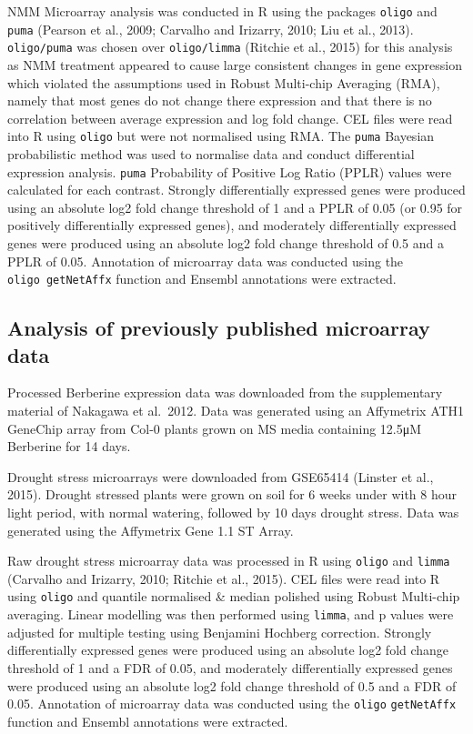 \documentclass[12pt,a4paper,]{report}
\begin{document}
NMM Microarray analysis was conducted in R using the packages
\texttt{oligo} and \texttt{puma} (Pearson et al., 2009; Carvalho and
Irizarry, 2010; Liu et al., 2013). \texttt{oligo/puma} was chosen over
\texttt{oligo/limma} (Ritchie et al., 2015) for this analysis as NMM
treatment appeared to cause large consistent changes in gene expression
which violated the assumptions used in Robust Multi-chip Averaging
(RMA), namely that most genes do not change there expression and that
there is no correlation between average expression and log fold change.
CEL files were read into R using \texttt{oligo} but were not normalised
using RMA. The \texttt{puma} Bayesian probabilistic method was used to
normalise data and conduct differential expression analysis.
\texttt{puma} Probability of Positive Log Ratio (PPLR) values were
calculated for each contrast. Strongly differentially expressed genes
were produced using an absolute log2 fold change threshold of 1 and a
PPLR of 0.05 (or 0.95 for positively differentially expressed genes),
and moderately differentially expressed genes were produced using an
absolute log2 fold change threshold of 0.5 and a PPLR of 0.05.
Annotation of microarray data was conducted using the
\texttt{oligo\ getNetAffx} function and Ensembl annotations were
extracted.

\hypertarget{analysis-of-previously-published-microarray-data}{%
\subsection{Analysis of previously published microarray
data}\label{analysis-of-previously-published-microarray-data}}

Processed Berberine expression data was downloaded from the
supplementary material of Nakagawa et al.~2012. Data was generated using
an Affymetrix ATH1 GeneChip array from Col-0 plants grown on MS media
containing 12.5μM Berberine for 14 days.

Drought stress microarrays were downloaded from GSE65414 (Linster et
al., 2015). Drought stressed plants were grown on soil for 6 weeks under
with 8 hour light period, with normal watering, followed by 10 days
drought stress. Data was generated using the Affymetrix Gene 1.1 ST
Array.

Raw drought stress microarray data was processed in R using
\texttt{oligo} and \texttt{limma} (Carvalho and Irizarry, 2010; Ritchie
et al., 2015). CEL files were read into R using \texttt{oligo} and
quantile normalised \& median polished using Robust Multi-chip
averaging. Linear modelling was then performed using \texttt{limma}, and
p values were adjusted for multiple testing using Benjamini Hochberg
correction. Strongly differentially expressed genes were produced using
an absolute log2 fold change threshold of 1 and a FDR of 0.05, and
moderately differentially expressed genes were produced using an
absolute log2 fold change threshold of 0.5 and a FDR of 0.05. Annotation
of microarray data was conducted using the \texttt{oligo}
\texttt{getNetAffx} function and Ensembl annotations were extracted.
\end{document}

